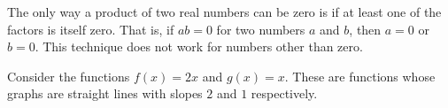 \documentclass{ximera}
\begin{document}
	\begin{remark}
	The only way a product of two real numbers can  be zero is if at least one of the factors is itself zero. That is, if $ab = 0$ for two numbers $a$ and $b$, then $a= 0$ or $b = 0$. This technique does not work for numbers other than zero. 
	\end{remark}

	Consider the functions $f(x) = 2x$ and $g(x) = x$. These are functions whose graphs are straight lines with slopes $2$ and $1$ respectively.
  	\begin{image}
	\end{image}
\end{document}
